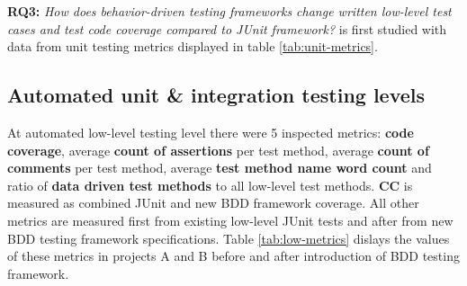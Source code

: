 \textbf{RQ3: }\textit{How does behavior-driven testing frameworks change written low-level test cases and test code coverage compared to JUnit framework?}
is first studied with data from unit testing metrics displayed in table \ref{tab:unit-metrics}.

\clearpage
\subsection{Automated unit \& integration testing levels}
\label{subsub:low-level-metrics}
At automated low-level testing level there were 5 inspected metrics: \textbf{code coverage}, average \textbf{count of assertions} per test method,
average \textbf{count of comments} per test method, average \textbf{test method name word count} and ratio of \textbf{data driven test methods} to
all low-level test methods. \textbf{CC} is measured as combined JUnit and new BDD framework coverage. All other metrics
are measured first from existing low-level JUnit tests and after from new BDD testing framework specifications.
Table \ref{tab:low-metrics} dislays the values of these metrics in projects A and B before and after introduction of BDD testing framework.


